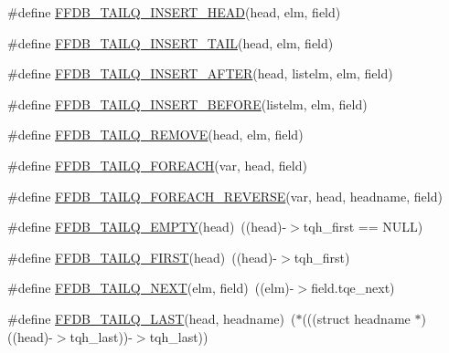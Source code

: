 \begin{DoxyCompactItemize}
\#define \mbox{\hyperlink{adat-devel_2other__libs_2filedb_2filehash_2ffdb__cq_8h_a712d6e1878cf5016733de1d8b0991e7c}{F\+F\+D\+B\+\_\+\+T\+A\+I\+L\+Q\+\_\+\+I\+N\+S\+E\+R\+T\+\_\+\+H\+E\+AD}}(head,  elm,  field)
\item 
\#define \mbox{\hyperlink{adat-devel_2other__libs_2filedb_2filehash_2ffdb__cq_8h_acc147b4f64d2c8b111cab3c176be1ea7}{F\+F\+D\+B\+\_\+\+T\+A\+I\+L\+Q\+\_\+\+I\+N\+S\+E\+R\+T\+\_\+\+T\+A\+IL}}(head,  elm,  field)
\item 
\#define \mbox{\hyperlink{adat-devel_2other__libs_2filedb_2filehash_2ffdb__cq_8h_a04a4234b5b11f2413d375d62814679cf}{F\+F\+D\+B\+\_\+\+T\+A\+I\+L\+Q\+\_\+\+I\+N\+S\+E\+R\+T\+\_\+\+A\+F\+T\+ER}}(head,  listelm,  elm,  field)
\item 
\#define \mbox{\hyperlink{adat-devel_2other__libs_2filedb_2filehash_2ffdb__cq_8h_a742b046ab0b8727c3c08c868e927421a}{F\+F\+D\+B\+\_\+\+T\+A\+I\+L\+Q\+\_\+\+I\+N\+S\+E\+R\+T\+\_\+\+B\+E\+F\+O\+RE}}(listelm,  elm,  field)
\item 
\#define \mbox{\hyperlink{adat-devel_2other__libs_2filedb_2filehash_2ffdb__cq_8h_a7cdd492ce9b3f734c9e85551ddfccef4}{F\+F\+D\+B\+\_\+\+T\+A\+I\+L\+Q\+\_\+\+R\+E\+M\+O\+VE}}(head,  elm,  field)
\item 
\#define \mbox{\hyperlink{adat-devel_2other__libs_2filedb_2filehash_2ffdb__cq_8h_a0f03d1b96196c22082a2f2cb96498e47}{F\+F\+D\+B\+\_\+\+T\+A\+I\+L\+Q\+\_\+\+F\+O\+R\+E\+A\+CH}}(var,  head,  field)
\item 
\#define \mbox{\hyperlink{adat-devel_2other__libs_2filedb_2filehash_2ffdb__cq_8h_ad234f4bab59580191cdefb8778b3ede2}{F\+F\+D\+B\+\_\+\+T\+A\+I\+L\+Q\+\_\+\+F\+O\+R\+E\+A\+C\+H\+\_\+\+R\+E\+V\+E\+R\+SE}}(var,  head,  headname,  field)
\item 
\#define \mbox{\hyperlink{adat-devel_2other__libs_2filedb_2filehash_2ffdb__cq_8h_a7ad592a8a799ed3c2a7d961d6bbd0fdb}{F\+F\+D\+B\+\_\+\+T\+A\+I\+L\+Q\+\_\+\+E\+M\+P\+TY}}(head)~((head)-\/$>$tqh\+\_\+first == N\+U\+LL)
\item 
\#define \mbox{\hyperlink{adat-devel_2other__libs_2filedb_2filehash_2ffdb__cq_8h_a8e7270cbf095144ce693997be142d401}{F\+F\+D\+B\+\_\+\+T\+A\+I\+L\+Q\+\_\+\+F\+I\+R\+ST}}(head)~((head)-\/$>$tqh\+\_\+first)
\item 
\#define \mbox{\hyperlink{adat-devel_2other__libs_2filedb_2filehash_2ffdb__cq_8h_ab7973d50130de65e2b746012b6ea7ada}{F\+F\+D\+B\+\_\+\+T\+A\+I\+L\+Q\+\_\+\+N\+E\+XT}}(elm,  field)~((elm)-\/$>$field.\+tqe\+\_\+next)
\item 
\#define \mbox{\hyperlink{adat-devel_2other__libs_2filedb_2filehash_2ffdb__cq_8h_a78b5f733ec739d6bb6f0cc58e6f9e4ad}{F\+F\+D\+B\+\_\+\+T\+A\+I\+L\+Q\+\_\+\+L\+A\+ST}}(head,  headname)~($\ast$(((struct headname $\ast$)((head)-\/$>$tqh\+\_\+last))-\/$>$tqh\+\_\+last))

\end{DoxyCompactItemize}
